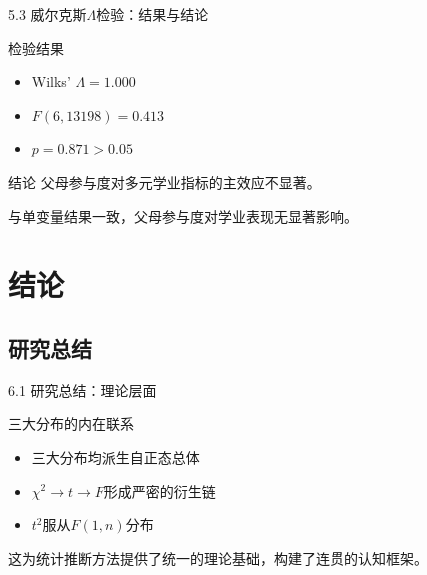 \documentclass{beamer}
\newenvironment{block*}
  {\setbeamercolor{block title}{bg=white,fg=white}%
   \begin{block}{}}
  {\end{block}}
\begin{document}
\begin{frame}{5.3 威尔克斯\(\Lambda\)检验：结果与结论}
    \begin{block}{检验结果}
        \begin{itemize}
            \item Wilks' \(\Lambda = 1.000\)
            \item \(F(6,13198) = 0.413\)
            \item \(p = 0.871 > 0.05\)
        \end{itemize}
    \end{block}

    \vspace{0.5cm}

    \begin{alertblock}{结论}
        父母参与度对多元学业指标的主效应不显著。
    \end{alertblock}

    \vspace{0.3cm}

    \begin{block*}
        与单变量结果一致，父母参与度对学业表现无显著影响。
    \end{block*}
\end{frame}



\section{结论}

\subsection{研究总结}
\begin{frame}{6.1 研究总结：理论层面}
    \begin{block}{三大分布的内在联系}
        \begin{itemize}
            \item 三大分布均派生自正态总体
            \item \(\chi^2 \to t \to F\)形成严密的衍生链
            \item \(t^2\)服从\(F(1, n)\)分布
        \end{itemize}
    \end{block}

    \vspace{0.5cm}

    \begin{block*}
        这为统计推断方法提供了统一的理论基础，构建了连贯的认知框架。
    \end{block*}
\end{frame}
\end{document}
